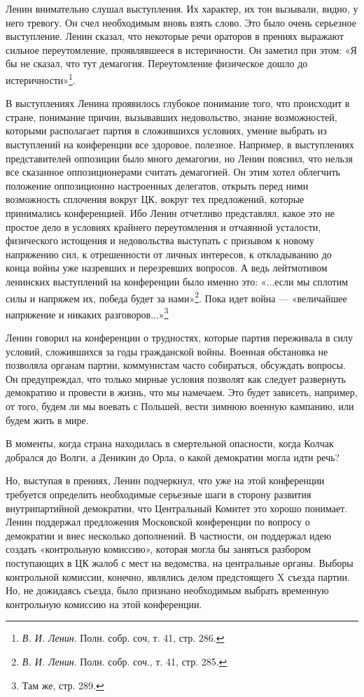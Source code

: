 \documentclass[12pt, a4paper, openany]{book}
\begin{document}
Ленин внимательно слушал выступления. Их характер, их тон вызывали, видно, у него тревогу. Он счел необходимым вновь взять слово. Это было очень серьезное выступление. Ленин сказал, что некоторые речи ораторов в прениях выражают сильное переутомление, проявлявшееся в истеричности. Он заметил при этом: «Я бы не сказал, что тут демагогия. Переутомление физическое дошло до истеричности»\footnote{\textit{В. И. Ленин}. Полн. собр. соч, т. 41, стр. 286.}.

В выступлениях Ленина проявилось глубокое понимание того, что происходит в стране, понимание причин, вызывавших недовольство, знание возможностей, которыми располагает партия в сложившихся условиях, умение выбрать из выступлений на конференции все здоровое, полезное. Например, в выступлениях представителей оппозиции было много демагогии, но Ленин пояснил, что нельзя все сказанное оппозиционерами считать демагогией. Он этим хотел облегчить положение оппозиционно настроенных делегатов, открыть перед ними возможность сплочения вокруг ЦК, вокруг тех предложений, которые принимались конференцией. Ибо Ленин отчетливо представлял, какое это не простое дело в условиях крайнего переутомления и отчаянной усталости, физического истощения и недовольства выступать с призывом к новому напряжению сил, к отрешенности от личных интересов, к откладыванию до конца войны уже назревших и перезревших вопросов. А ведь лейтмотивом ленинских выступлений на конференции было именно это: «...если мы сплотим силы и напряжем их, победа будет за нами»\footnote{\textit{В. И. Ленин}. Полн. собр. соч., т. 41, стр. 285.}. Пока идет война — «величайшее напряжение и никаких разговоров...»\footnote{Там же, стр. 289.}

Ленин говорил на конференции о трудностях, которые партия переживала в силу условий, сложившихся за годы гражданской войны. Военная обстановка не позволяла органам партии, коммунистам часто собираться, обсуждать вопросы. Он предупреждал, что только мирные условия позволят как следует развернуть демократию и провести в жизнь, что мы намечаем. Это будет зависеть, например, от того, будем ли мы воевать с Польшей, вести зимнюю военную кампанию, или будем жить в мире.

В моменты, когда страна находилась в смертельной опасности, когда Колчак добрался до Волги, а Деникин до Орла, о какой демократии могла идти речь?

Но, выступая в прениях, Ленин подчеркнул, что уже на этой конференции требуется определить необходимые серьезные шаги в сторону развития внутрипартийной демократии, что Центральный Комитет это хорошо понимает. Ленин поддержал предложения Московской конференции по вопросу о демократии и внес несколько дополнений. В частности, он поддержал идею создать «контрольную комиссию», которая могла бы заняться разбором поступающих в ЦК жалоб с мест на ведомства, на центральные органы. Выборы контрольной комиссии, конечно, являлись делом предстоящего X съезда партии. Но, не дожидаясь съезда, было признано необходимым выбрать временную контрольную комиссию на этой конференции.
\end{document}
